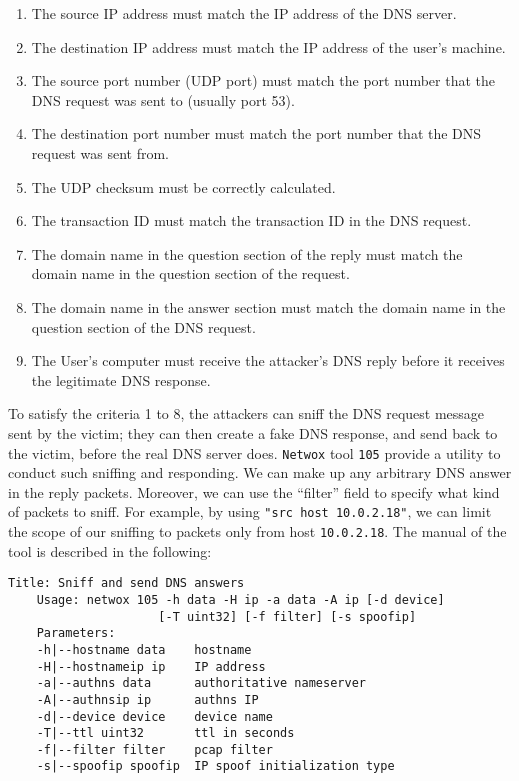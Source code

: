\begin{enumerate}

\item The source IP address must match the IP address of the DNS server.

\item The destination IP address must match the IP address of the user's machine.

\item The source port number (UDP port) must match the port number that the DNS
request was sent to (usually port 53).

\item The destination port number must match the port number that the DNS
request was sent from.

\item The UDP checksum must be correctly calculated. 

\item The transaction ID must match the transaction ID in the DNS request.

\item The domain name in the question section of the reply must match the 
domain name in the question section of the request.

\item The domain name in the answer section must match the domain name in the
question section of the DNS request.

\item The User's computer must receive the attacker's DNS reply before it
receives the legitimate DNS response.
\end{enumerate}


To satisfy the criteria 1 to 8, the attackers can sniff the DNS request message
sent by the victim; they can then create a fake DNS response, and send back to the victim,
before the real DNS server does. {\tt Netwox} tool \texttt{105} provide a utility to conduct
such sniffing and responding.
We can make up any arbitrary DNS answer
in the reply packets. Moreover, we can use the ``filter'' field to specify what
kind of packets to sniff. For example, by using
\texttt{"src host 10.0.2.18"}, we can limit the scope of our
sniffing to packets only from host \texttt{10.0.2.18}.  The manual of the
tool is described in the following:

\begin{lstlisting}[caption={The usage of the Netwox Tool 105}]
Title: Sniff and send DNS answers
    Usage: netwox 105 -h data -H ip -a data -A ip [-d device]
                     [-T uint32] [-f filter] [-s spoofip]
    Parameters:
    -h|--hostname data    hostname
    -H|--hostnameip ip    IP address
    -a|--authns data      authoritative nameserver
    -A|--authnsip ip      authns IP
    -d|--device device    device name
    -T|--ttl uint32       ttl in seconds
    -f|--filter filter    pcap filter
    -s|--spoofip spoofip  IP spoof initialization type
\end{lstlisting}


